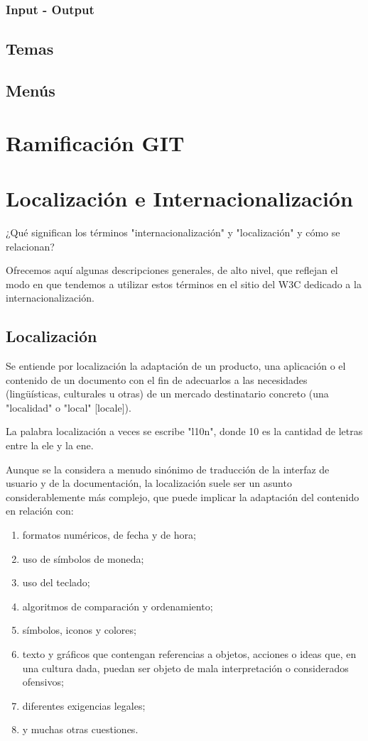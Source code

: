 \subsubsection{Input - Output}
\subsection{Temas}
\subsection{Menús}
\section{Ramificación GIT}

\section{Localización e Internacionalización}

\cite{w3}¿Qué significan los términos "internacionalización" y "localización" y cómo se relacionan?

Ofrecemos aquí algunas descripciones generales, de alto nivel, que reflejan el modo en que tendemos a utilizar estos términos en el sitio del W3C dedicado a la internacionalización.

\subsection{Localización}

Se entiende por localización la adaptación de un producto, una aplicación o el contenido de un documento con el fin de adecuarlos a las necesidades (lingüísticas, culturales u otras) de un mercado destinatario concreto (una "localidad" o "local" [locale]).

\begin{remark}
La palabra localización a veces se escribe "l10n", donde 10 es la cantidad de letras entre la ele y la ene.
\end{remark}


Aunque se la considera a menudo sinónimo de traducción de la interfaz de usuario y de la documentación, la localización suele ser un asunto considerablemente más complejo, que puede implicar la adaptación del contenido en relación con:

\begin{enumerate}
	\item formatos numéricos, de fecha y de hora;
	\item uso de símbolos de moneda;
	\item uso del teclado;
	\item algoritmos de comparación y ordenamiento;
	\item símbolos, iconos y colores;
	\item texto y gráficos que contengan referencias a objetos, acciones o ideas que, en una cultura dada, puedan ser objeto de mala interpretación o considerados ofensivos;
	\item diferentes exigencias legales;
	\item y muchas otras cuestiones.
\end{enumerate}

